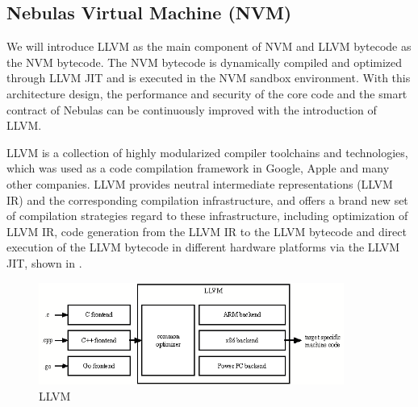 \subsection{Nebulas Virtual Machine (NVM)}
\label{sec:nvm}

We will introduce LLVM \cite{llvm} as the main component of NVM and
LLVM bytecode as the NVM bytecode. The NVM bytecode is dynamically
compiled and optimized through LLVM JIT and is executed in the NVM sandbox environment. With this architecture design, the performance and security of the core code and the smart contract of Nebulas can be continuously improved with the introduction of LLVM.


LLVM is a collection of highly modularized compiler toolchains and
technologies, which was used as a code compilation framework in Google, Apple
and many other companies. LLVM provides neutral intermediate representations
(LLVM IR) and the corresponding compilation infrastructure, and offers a brand
new set of compilation strategies regard to these infrastructure, including
optimization of LLVM IR, code generation from the LLVM IR to the LLVM bytecode
and direct execution of the LLVM bytecode in different hardware platforms via
the LLVM JIT, shown in . \\


\begin{figure}[h]
\centering
\includegraphics[width=10cm]{./figs/llvm}
\caption{LLVM}
\label{fig:llvm}
\end{figure}

